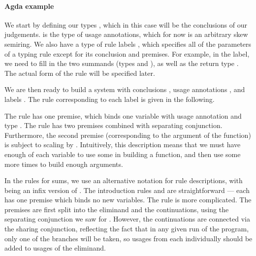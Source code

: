 \paragraph{Agda example}

We start by defining our types , which in this case will be the
conclusions of our judgements.
 is the type of usage annotations, which for now is an
arbitrary skew semiring.
We also have a type of rule labels , which specifies all of
the parameters of a typing rule except for its conclusion and premises.
For example, in the  label, we need to fill in
the two summands (types  and ), as well as the return
type .
The actual form of the rule will be specified later.

\exItypes{} \exIlabels{}

We are then ready to build a system  with conclusions
, usage annotations , and labels
.
The rule corresponding to each label is given in the following.

The  rule has one premise, which binds one
variable with usage annotation  and type .
The  rule has two premises combined with
separating conjunction.
Furthermore, the second premise (corresponding to the argument of the function)
is subject to scaling by .
Intuitively, this description means that we must have enough of each variable to
use some in building a function, and then use some more  times to
build enough arguments.

\exIfunrules{}

In the rules for sums, we use an alternative notation for rule descriptions,
with \AgdaFunction{{---}{---}} being an infix version of
.
The introduction rules  and
 are straightforward --- each has one
premise which binds no new variables.
The  rule is more complicated.
The premises are first split into the eliminand and the continuations, using the
separating conjunction we saw for .
However, the continuations are connected via the sharing conjunction, reflecting
the fact that in any given run of the program, only one of the branches will be
taken, so usages from each individually should be added to usages of the
eliminand.

